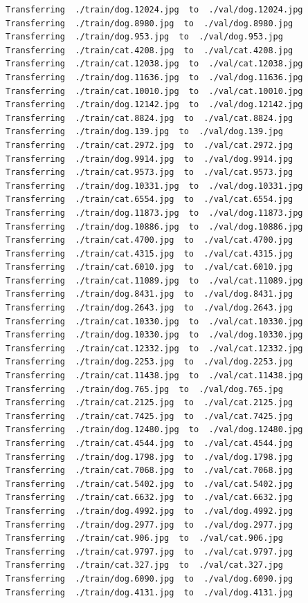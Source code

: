 \documentclass[]{book}
\theoremstyle{definition}
\theoremstyle{definition}
\theoremstyle{definition}
\theoremstyle{remark}
\begin{document}
\begin{verbatim}
Transferring  ./train/dog.12024.jpg  to  ./val/dog.12024.jpg
Transferring  ./train/dog.8980.jpg  to  ./val/dog.8980.jpg
Transferring  ./train/dog.953.jpg  to  ./val/dog.953.jpg
Transferring  ./train/cat.4208.jpg  to  ./val/cat.4208.jpg
Transferring  ./train/cat.12038.jpg  to  ./val/cat.12038.jpg
Transferring  ./train/dog.11636.jpg  to  ./val/dog.11636.jpg
Transferring  ./train/cat.10010.jpg  to  ./val/cat.10010.jpg
Transferring  ./train/dog.12142.jpg  to  ./val/dog.12142.jpg
Transferring  ./train/cat.8824.jpg  to  ./val/cat.8824.jpg
Transferring  ./train/dog.139.jpg  to  ./val/dog.139.jpg
Transferring  ./train/cat.2972.jpg  to  ./val/cat.2972.jpg
Transferring  ./train/dog.9914.jpg  to  ./val/dog.9914.jpg
Transferring  ./train/cat.9573.jpg  to  ./val/cat.9573.jpg
Transferring  ./train/dog.10331.jpg  to  ./val/dog.10331.jpg
Transferring  ./train/cat.6554.jpg  to  ./val/cat.6554.jpg
Transferring  ./train/dog.11873.jpg  to  ./val/dog.11873.jpg
Transferring  ./train/dog.10886.jpg  to  ./val/dog.10886.jpg
Transferring  ./train/cat.4700.jpg  to  ./val/cat.4700.jpg
Transferring  ./train/cat.4315.jpg  to  ./val/cat.4315.jpg
Transferring  ./train/cat.6010.jpg  to  ./val/cat.6010.jpg
Transferring  ./train/cat.11089.jpg  to  ./val/cat.11089.jpg
Transferring  ./train/dog.8431.jpg  to  ./val/dog.8431.jpg
Transferring  ./train/dog.2643.jpg  to  ./val/dog.2643.jpg
Transferring  ./train/cat.10330.jpg  to  ./val/cat.10330.jpg
Transferring  ./train/dog.10330.jpg  to  ./val/dog.10330.jpg
Transferring  ./train/cat.12332.jpg  to  ./val/cat.12332.jpg
Transferring  ./train/dog.2253.jpg  to  ./val/dog.2253.jpg
Transferring  ./train/cat.11438.jpg  to  ./val/cat.11438.jpg
Transferring  ./train/dog.765.jpg  to  ./val/dog.765.jpg
Transferring  ./train/cat.2125.jpg  to  ./val/cat.2125.jpg
Transferring  ./train/cat.7425.jpg  to  ./val/cat.7425.jpg
Transferring  ./train/dog.12480.jpg  to  ./val/dog.12480.jpg
Transferring  ./train/cat.4544.jpg  to  ./val/cat.4544.jpg
Transferring  ./train/dog.1798.jpg  to  ./val/dog.1798.jpg
Transferring  ./train/cat.7068.jpg  to  ./val/cat.7068.jpg
Transferring  ./train/cat.5402.jpg  to  ./val/cat.5402.jpg
Transferring  ./train/cat.6632.jpg  to  ./val/cat.6632.jpg
Transferring  ./train/dog.4992.jpg  to  ./val/dog.4992.jpg
Transferring  ./train/dog.2977.jpg  to  ./val/dog.2977.jpg
Transferring  ./train/cat.906.jpg  to  ./val/cat.906.jpg
Transferring  ./train/cat.9797.jpg  to  ./val/cat.9797.jpg
Transferring  ./train/cat.327.jpg  to  ./val/cat.327.jpg
Transferring  ./train/dog.6090.jpg  to  ./val/dog.6090.jpg
Transferring  ./train/dog.4131.jpg  to  ./val/dog.4131.jpg

\end{verbatim}
\end{document}
